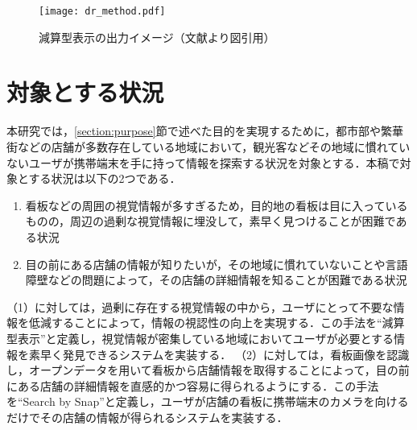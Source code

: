     \begin{figure}[tb]
      \centerline{\texttt{[image: dr\_method.pdf]}}
      \caption{減算型表示の出力イメージ（文献\cite{Kitamura:2017a}より図引用）}
      \label{figure:dr_method}
    \end{figure}

\section{対象とする状況}
\label{section:target_situation}
  本研究では，\ref{section:purpose}節で述べた目的を実現するために，都市部や繁華街などの店舗が多数存在している地域において，観光客などその地域に慣れていないユーザが携帯端末を手に持って情報を探索する状況を対象とする．本稿で対象とする状況は以下の2つである．
  \begin{enumerate}
    \item 看板などの周囲の視覚情報が多すぎるため，目的地の看板は目に入っているものの，周辺の過剰な視覚情報に埋没して，素早く見つけることが困難である状況
    \item 目の前にある店舗の情報が知りたいが，その地域に慣れていないことや言語障壁などの問題によって，その店舗の詳細情報を知ることが困難である状況
  \end{enumerate}
  （1）に対しては，過剰に存在する視覚情報の中から，ユーザにとって不要な情報を低減することによって，情報の視認性の向上を実現する．この手法を``減算型表示''と定義し，視覚情報が密集している地域においてユーザが必要とする情報を素早く発見できるシステムを実装する．
  （2）に対しては，看板画像を認識し，オープンデータを用いて看板から店舗情報を取得することによって，目の前にある店舗の詳細情報を直感的かつ容易に得られるようにする．この手法を``Search by Snap''と定義し，ユーザが店舗の看板に携帯端末のカメラを向けるだけでその店舗の情報が得られるシステムを実装する．
  
